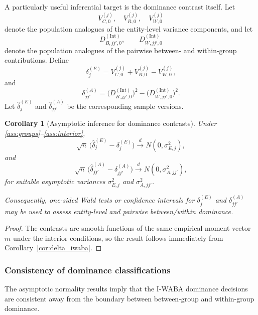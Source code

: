 \documentclass[preprint, times, 12pt, authoryear]{elsarticle}
\newtheorem{corollary}[theorem]{Corollary}
\begin{document}
A particularly useful inferential target is the dominance contrast itself. Let
\[
V_{C,0}^{(j)},\quad V_{R,0}^{(j)},\quad V_{W,0}^{(j)}
\]
denote the population analogues of the entity-level variance components, and let
\[
D_{B,jj',0}^{(\mathrm{Int})},\qquad D_{W,jj',0}^{(\mathrm{Int})}
\]
denote the population analogues of the pairwise between- and within-group contributions. Define
\begin{equation}\label{eq:entity_contrast_pop}
	\delta_j^{(E)}
	=
	V_{C,0}^{(j)}+V_{R,0}^{(j)}-V_{W,0}^{(j)},
\end{equation}
and
\begin{equation}\label{eq:assoc_contrast_pop}
	\delta_{jj'}^{(A)}
	=
	\bigl(D_{B,jj',0}^{(\mathrm{Int})}\bigr)^2
	-
	\bigl(D_{W,jj',0}^{(\mathrm{Int})}\bigr)^2.
\end{equation}
Let $\hat\delta_j^{(E)}$ and $\hat\delta_{jj'}^{(A)}$ be the corresponding sample versions.

\begin{corollary}[Asymptotic inference for dominance contrasts]\label{cor:dominance_clt}
	Under \ref{ass:groups}--\ref{ass:interior},
	\[
	\sqrt{n}\,\bigl(\hat\delta_j^{(E)}-\delta_j^{(E)}\bigr)
	\xrightarrow{d}
	N(0,\sigma_{E,j}^2),
	\]
	and
	\[
	\sqrt{n}\,\bigl(\hat\delta_{jj'}^{(A)}-\delta_{jj'}^{(A)}\bigr)
	\xrightarrow{d}
	N(0,\sigma_{A,jj'}^2),
	\]
	for suitable asymptotic variances $\sigma_{E,j}^2$ and $\sigma_{A,jj'}^2$.
	
	Consequently, one-sided Wald tests or confidence intervals for $\delta_j^{(E)}$ and $\delta_{jj'}^{(A)}$ may be used to assess entity-level and pairwise between/within dominance.
\end{corollary}

\begin{proof}
	The contrasts are smooth functions of the same empirical moment vector $m$ under the interior conditions, so the result follows immediately from Corollary~\ref{cor:delta_iwaba}.
\end{proof}

\subsubsection{Consistency of dominance classifications}

The asymptotic normality results imply that the I-WABA dominance decisions are consistent away from the boundary between between-group and within-group dominance.
\end{document}
